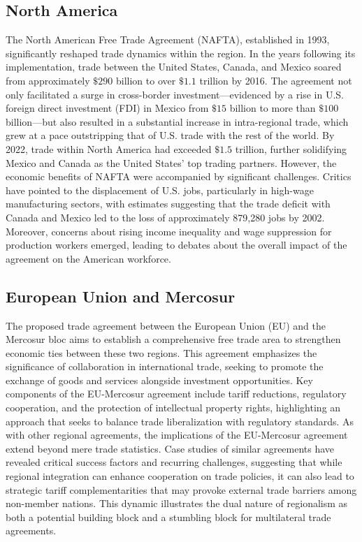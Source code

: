 \documentclass[12pt]{article}
\begin{document}
\subsection{North America}
The North American Free Trade Agreement (NAFTA), established in 1993, significantly reshaped trade dynamics within the region. In the years following its implementation, trade between the United States, Canada, and Mexico soared from approximately $\$290$ billion to over $\$1.1$ trillion by 2016. The agreement not only facilitated a surge in cross-border investment—evidenced by a rise in U.S. foreign direct investment (FDI) in Mexico from $\$15$ billion to more than $\$100$ billion—but also resulted in a substantial increase in intra-regional trade, which grew at a pace outstripping that of U.S. trade with the rest of the world. By 2022, trade within North America had exceeded $\$1.5$ trillion, further solidifying Mexico and Canada as the United States' top trading partners. However, the economic benefits of NAFTA were accompanied by significant challenges. Critics have pointed to the displacement of U.S. jobs, particularly in high-wage manufacturing sectors, with estimates suggesting that the trade deficit with Canada and Mexico led to the loss of approximately 879,280 jobs by 2002. Moreover, concerns about rising income inequality and wage suppression for production workers emerged, leading to debates about the overall impact of the agreement on the American workforce.

\subsection{European Union and Mercosur}
The proposed trade agreement between the European Union (EU) and the Mercosur bloc aims to establish a comprehensive free trade area to strengthen economic ties between these two regions. This agreement emphasizes the significance of collaboration in international trade, seeking to promote the exchange of goods and services alongside investment opportunities. Key components of the EU-Mercosur agreement include tariff reductions, regulatory cooperation, and the protection of intellectual property rights, highlighting an approach that seeks to balance trade liberalization with regulatory standards. As with other regional agreements, the implications of the EU-Mercosur agreement extend beyond mere trade statistics. Case studies of similar agreements have revealed critical success factors and recurring challenges, suggesting that while regional integration can enhance cooperation on trade policies, it can also lead to strategic tariff complementarities that may provoke external trade barriers among non-member nations. This dynamic illustrates the dual nature of regionalism as both a potential building block and a stumbling block for multilateral trade agreements.
\end{document}

